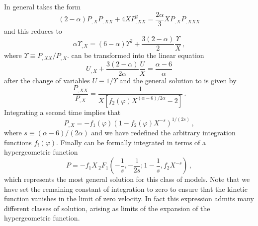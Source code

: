In general  takes the form 
% 
\begin{equation}
\label{eq:genPXeqn-multi}
(2-\alpha ) P_{,X}P_{,XX} + 4XP^2_{,XX} = \frac{2\alpha }{3}
X P_{,X}P_{,XXX}
\end{equation}
% 
and this reduces to 
% 
\begin{equation}
\label{eq:genreduce-multi}
\alpha \Upsilon_{,X} = (6-\alpha ) \Upsilon^2 + \frac{3(2-\alpha )}{2}
\frac{\Upsilon}{X} \, ,
\end{equation}
% 
where $\Upsilon \equiv P_{,XX}/P_{,X}$. 
 can be transformed into the 
linear equation
% 
\begin{equation}
\label{eq:lineargen-multi}
U_{,X}+ \frac{3(2-\alpha )}{2\alpha} \frac{U}{X} = \frac{\alpha -6}{\alpha}
\end{equation}
% 
after the change of variables $U \equiv 1/\Upsilon$
and the general solution to  is given by
%  
\begin{equation}
\label{eq:gensolnlinear-multi}
\frac{P_{,XX}}{P_{,X}} = \frac{1}{X\left[ f_2(\varphi) X^{(\alpha -6)/2\alpha}
-2 \right] } \, .
\end{equation}
% 
Integrating a second time implies that
% 
\begin{equation}
\label{eq:secondint-multi}
P_{,X} = -f_1 (\varphi ) \left( 1- f_2(\varphi ) X^{-s} \right)^{1/(2s)}  \, ,
\end{equation}
% 
where $s \equiv (\alpha -6 )/(2 \alpha)$ and we have redefined 
the arbitrary integration functions $f_i(\varphi )$.  
Finally  can be formally integrated 
in terms of a hypergeometric function
%  
\begin{equation}
 \label{eq:thirdint-multi}
 P= -f_1X \,{_2}F_1 \left( -\frac{1}{s}, -\frac{1}{2s}; 1-\frac{1}{s}, f_2X^{-s}
\right)  \, ,
\end{equation}
%  
which represents the most general solution for this class of models. 
Note that we have set the
remaining constant of integration to zero to ensure 
that the kinetic function vanishes in the limit of
zero velocity. In fact this expression admits many 
different classes of solution, arising as limits
of the expansion of the hypergeometric function.





